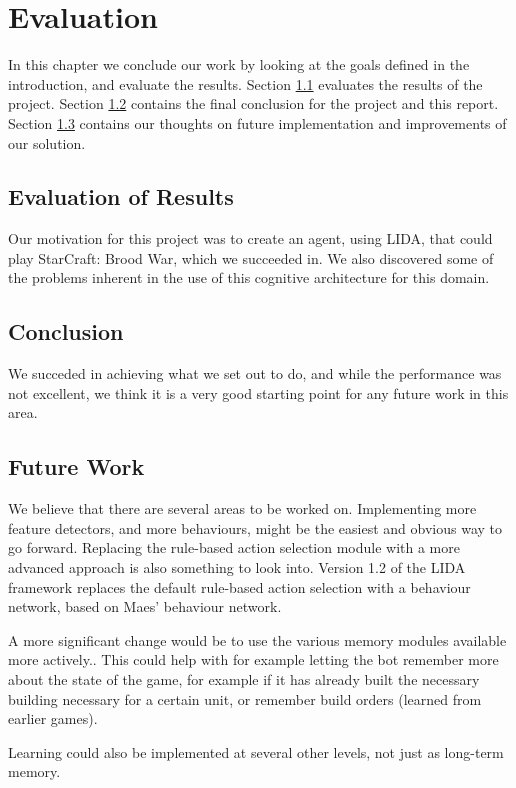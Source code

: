 
\chapter{Evaluation}
In this chapter we conclude our work by looking at the goals defined in the
introduction, and evaluate the results.
Section \ref{sec:evalres} evaluates the results of the project.
Section \ref{sec:conclusion} contains the final conclusion for the project and this report. 
Section \ref{sec:futurework} contains our thoughts on future implementation and improvements of our solution.



\section{Evaluation of Results}
\label{sec:evalres}
Our motivation for this project was to create an agent, using LIDA, that could play StarCraft: Brood War, which we succeeded in. We also discovered some of the problems inherent in the use of this cognitive architecture for this domain.


\section{Conclusion}
\label{sec:conclusion}
We succeded in achieving what we set out to do, and while the performance was not excellent, we think it is a very good starting point for any future work in this area.

\section{Future Work}
\label{sec:futurework}
We believe that there are several areas to be worked on. Implementing more feature detectors, and more behaviours, might be the easiest and obvious way to go forward. Replacing the rule-based action selection module with a more advanced approach is also something to look into. Version 1.2 of the LIDA framework replaces the default rule-based action selection with a behaviour network, based on Maes' behaviour network.\cite{maes1989right}

A more significant change would be to use the various memory modules available more actively.\cite{franklin2007lida}. This could help with for example letting the bot remember more about the state of the game, for example if it has already built the necessary building necessary for a certain unit, or remember build orders (learned from earlier games).

Learning could also be implemented at several other levels, not just as long-term memory.
